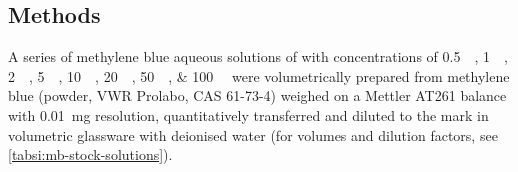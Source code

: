 \documentclass[9pt,twoside,twocolumn]{article}\usepackage{knitr}
\newcommand{\startsupplement}{%
   \setcounter{table}{0}%
   \renewcommand{\thetable}{S\arabic{table}}%
   \setcounter{figure}{0}%
   \renewcommand{\thefigure}{S\arabic{figure}}%
}
\begin{document}
\clearpage

\pagestyle{empty}

\begin{refsection}
\startsupplement


























































\clearpage
{}
\newpage



\section*{Methods}

A series of methylene blue aqueous solutions of with concentrations of \qtylist{0.5;1;2;5;10;20;50;100}{\micro\molar} were volumetrically prepared from methylene blue (powder, VWR Prolabo, CAS 61-73-4) weighed on a Mettler AT261 balance with \qty{0.01}{\mg} resolution, quantitatively transferred and diluted to the mark in volumetric glassware with deionised water (for volumes and dilution factors, see \cref{tabsi:mb-stock-solutions}). 


\end{refsection}
\end{document}
